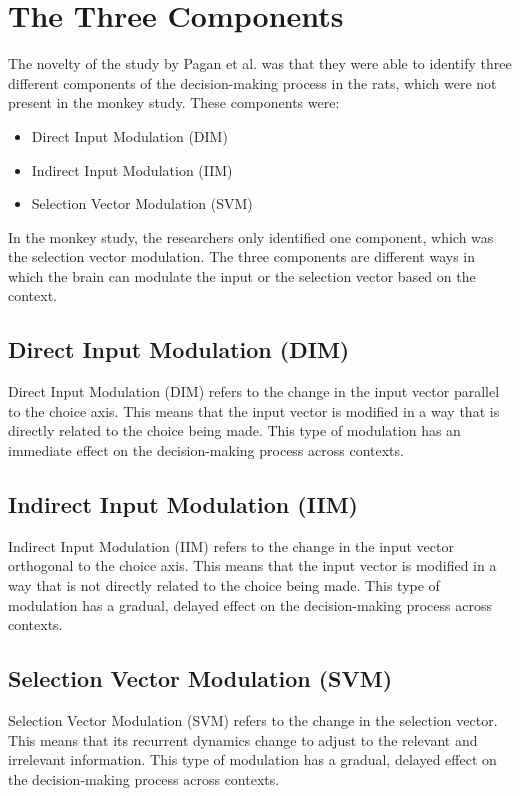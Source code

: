 \documentclass{article}
\begin{document}
\section{The Three Components}
The novelty of the study by Pagan et al. was that they were able to identify three different components of the decision-making process in the rats, which were not present in the monkey study. These components were:
\begin{itemize}
    \item Direct Input Modulation (DIM)
    \item Indirect Input Modulation (IIM)
    \item Selection Vector Modulation (SVM)
\end{itemize}
In the monkey study, the researchers only identified one component, which was the selection vector modulation. The three components are different ways in which the brain can modulate the input or the selection vector based on the context.

\subsection{Direct Input Modulation (DIM)}
Direct Input Modulation (DIM) refers to the change in the input vector parallel to the choice axis. This means that the input vector is modified in a way that is directly related to the choice being made. This type of modulation has an immediate effect on the decision-making process across contexts.

\subsection{Indirect Input Modulation (IIM)}
Indirect Input Modulation (IIM) refers to the change in the input vector orthogonal to the choice axis. This means that the input vector is modified in a way that is not directly related to the choice being made. This type of modulation has a gradual, delayed effect on the decision-making process across contexts.

\subsection{Selection Vector Modulation (SVM)}
Selection Vector Modulation (SVM) refers to the change in the selection vector. This means that its recurrent dynamics change to adjust to the relevant and irrelevant information. This type of modulation has a gradual, delayed effect on the decision-making process across contexts.
\end{document}
